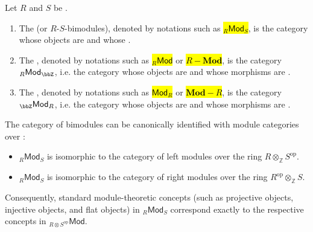 \begin{definition} \label{definition:category_of_modules_and_bimodules_over_rings}
    Let $R$ and $S$ be .     
    \begin{enumerate}
        \item The  (or $R$-$S$-bimodules), denoted by notations such as \hl{${}_R\mathsf{Mod}_S$}, is the category whose objects are  and whose .

        \item The , denoted by notations such as \hl{${}_R\mathsf{Mod}$} or \hl{$R-\mathbf{Mod}$}, is the category ${}_R\mathsf{Mod}_\bbZ$, i.e. the category whose objects are  and whose morphisms are .

        \item The , denoted by notations such as \hl{$\mathsf{Mod}_R$} or \hl{$\mathbf{Mod}-R$}, is the category ${}_\bbZ\mathsf{Mod}_R$, i.e. the category whose objects are  and whose morphisms are .
    \end{enumerate}

    The category of bimodules can be canonically identified with module categories over :
    \begin{itemize}
        \item ${}_R\mathsf{Mod}_S$ is isomorphic to the category of left modules over the ring $R \otimes_{\mathbb{Z}} S^{\operatorname{op}}$.
        \item ${}_R\mathsf{Mod}_S$ is isomorphic to the category of right modules over the ring $R^{\operatorname{op}} \otimes_{\mathbb{Z}} S$.
    \end{itemize}
    Consequently, standard module-theoretic concepts (such as projective objects, injective objects, and flat objects) in ${}_R\mathsf{Mod}_S$ correspond exactly to the respective concepts in ${}_{R \otimes S^{\operatorname{op}}}\mathsf{Mod}$.


\end{definition}
